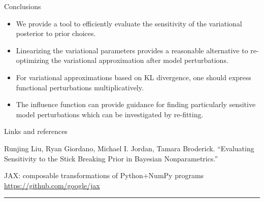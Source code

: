 \begin{frame}{Conclusions}

\begin{itemize}
\item We provide a tool to efficiently evaluate the sensitivity of the variational posterior to prior choices.
\item Linearizing the variational parameters provides a reasonable alternative to
re-optimizing the variational approximation
after model perturbations.
\item For variational approximations based on KL divergence, one should express
functional perturbations multiplicatively.
\item The influence function can provide guidance for finding particularly sensitive model perturbations which can be investigated by re-fitting.
\end{itemize}

\end{frame}


\begin{frame}{Links and references}

\footnotesize

Runjing Liu, Ryan Giordano, Michael I. Jordan, Tamara Broderick. \newline
“Evaluating Sensitivity to the Stick Breaking Prior in Bayesian Nonparametrics.”


%
%
JAX: composable transformations of Python+NumPy programs \newline
{\color{blue}\url{https://github.com/google/jax}}
\vspace{-0.5em}

\par\noindent\rule{\textwidth}{0.4pt}

\vspace{-0.5em}


\begingroup
\renewcommand{\section}[2]{}%

\endgroup

\end{frame}
